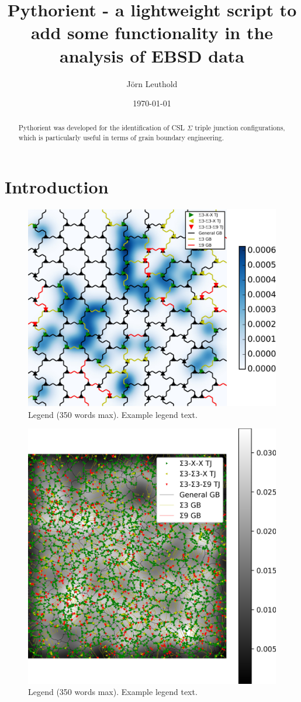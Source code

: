 \documentclass{article}
\title{Pythorient - a lightweight script to add some functionality in the analysis of EBSD data}
\author{J\"orn Leuthold}
\date{\today}
\begin{document}
\maketitle


\begin{abstract}
Pythorient was developed for the identification of CSL $\Sigma$ triple junction configurations, which is particularly useful in terms of grain boundary engineering.  


\end{abstract}

\section{Introduction}
\begin{figure}[ht]
\centering
\includegraphics[width=\linewidth]{figs/Generated_OIM}
\caption{Legend (350 words max). Example legend text.}
\label{fig:generated}
\end{figure}

\begin{figure}[ht]
\centering
\includegraphics[width=\linewidth]{figs/Cu_TJ_analysis}
\caption{Legend (350 words max). Example legend text.}
\label{fig:stream}
\end{figure}
\end{document}
